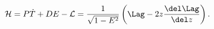 \begin{equation} \label{H0}
{\cal H} = P\dot{T} + D E - {\cal L} =
\frac{1}{\sqrt{1-E^2}}
\left(\Lag - 2z \frac{\del\Lag}{\del z}\right).
\end{equation}


